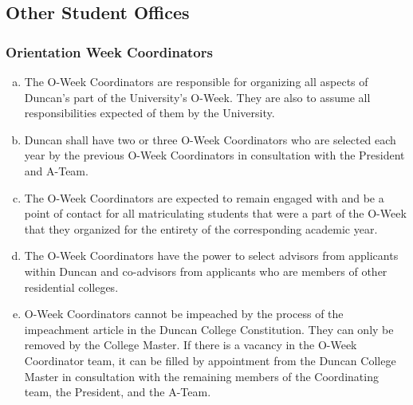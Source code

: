 \documentclass[USletter,12pt]{article}
\begin{document}
\begin{enumerate}[(a)]
\subsection{Other Student Offices}


\subsubsection{Orientation Week Coordinators}
\begin{enumerate}[(a)]
\item The O-Week Coordinators are responsible for organizing all aspects of Duncan's part of the University's O-Week.  They are also to assume all responsibilities expected of them by the University.
\item Duncan shall have two or three O-Week Coordinators who are selected each year by the previous O-Week Coordinators in consultation with the President and A-Team.
\item The O-Week Coordinators are expected to remain engaged with and be a point of contact for all matriculating students that were a part of the O-Week that they organized for the entirety of the corresponding academic year.
\item The O-Week Coordinators have the power to select advisors from applicants within Duncan and co-advisors from applicants who are members of other residential colleges.
\item O-Week Coordinators cannot be impeached by the process of the impeachment article in the Duncan College Constitution.  They can only be removed by the College Master.  If there is a vacancy in the O-Week Coordinator team, it can be filled by appointment from the Duncan College Master in consultation with the remaining members of the Coordinating team, the President, and the A-Team.
\end{enumerate}


\end{enumerate}
\end{document}
